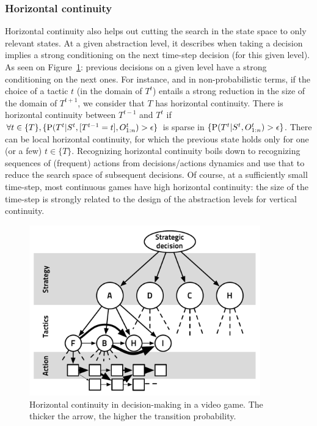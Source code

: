 \subsubsection{Horizontal continuity}
\label{sec:horizontalcontinuity}
Horizontal continuity also helps out cutting the search in the state space to only relevant states. At a given abstraction level, it describes when taking a decision implies a strong conditioning on the next time-step decision (for this given level). As seen on Figure~\ref{fig:horizontalcont}: previous decisions on a given level have a strong conditioning on the next ones. For instance, and in non-probabilistic terms, if the choice of a tactic $t$ (in the domain of $T^t$) entails a strong reduction in the size of the domain of $T^{t+1}$, we consider that $T$ has horizontal continuity. There is horizontal continuity between $T^{t-1}$ and $T^t$ if $\forall t \in \{T\}, \{\mathrm{P}(T^t|S^t,[T^{t-1}=t],O_{1:n}^t) > \epsilon\}$ is sparse in $\{\mathrm{P}(T^t|S^t,O_{1:n}^t) > \epsilon\}$. There can be local horizontal continuity, for which the previous state holds only for one (or a few) $t \in \{T\}$. Recognizing horizontal continuity boils down to recognizing sequences of (frequent) actions from decisions/actions dynamics and use that to reduce the search space of subsequent decisions. Of course, at a sufficiently small time-step, most continuous games have high horizontal continuity: the size of the time-step is strongly related to the design of the abstraction levels for vertical continuity.

\begin{figure}
\begin{center}
\includegraphics[width=10cm]{images/horizontal_cont_abstract_decision_hierarchy3.pdf}
\end{center}
\caption{Horizontal continuity in decision-making in a video game. The thicker the arrow, the higher the transition probability.}
\label{fig:horizontalcont}
\end{figure}


